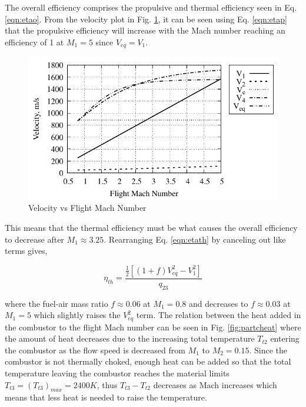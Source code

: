 \documentclass[conf]{new-aiaa} %
\begin{document}
The overall efficiency comprises the propulsive and thermal efficiency seen in Eq. \ref{eqn:etao}. From the velocity plot in Fig. \ref{fig:partcvelocity}, it can be seen using Eq. \ref{eqn:etap} that the propulsive efficiency will increase with the Mach number reaching an efficiency of 1 at $M_1=5$ since $V_{eq}=V_1$. 

\begin{figure}[H] %
    \centering
    \includegraphics[]{media/performance_parameter_files/part_c_velocity.pdf}
    \caption{\label{fig:partcvelocity}Velocity vs Flight Mach Number}
\end{figure}

This means that the thermal efficiency must be what causes the overall efficiency to decrease after $M_1\approx3.25$. Rearranging Eq. \ref{eqn:etath} by canceling out like terms gives,

\begin{equation}
    \label{eqn:partcetath}
    \eta_{th}=\frac{\frac{1}{2}\left[(1+f)V_{eq}^2-V_1^2\right]}{q_{23}}
\end{equation}

where the fuel-air mass ratio $f\approx0.06$ at $M_1=0.8$ and decreases to $f\approx0.03$ at $M_1=5$ which slightly raises the $V_{eq}^2$ term. The relation between the heat added in the combustor to the flight Mach number can be seen in Fig. \ref{fig:partcheat} where the amount of heat decreases due to the increasing total temperature $T_{t2}$ entering the combustor as the flow speed is decreased from $M_1$ to $M_2=0.15$. Since the combustor is not thermally choked, enough heat can be added so that the total temperature leaving the combustor reaches the material limits $T_{t3}=(T_{t3})_{max}=2400K$, thus $T_{t3}-T_{t2}$ decreases as Mach increases which means that less heat is needed to raise the temperature.
\end{document}
